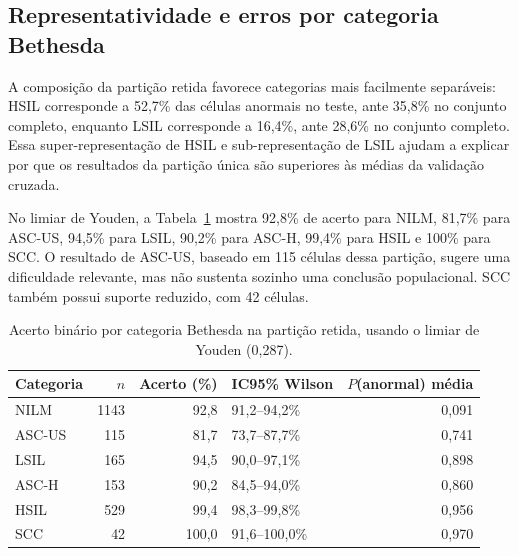 \subsection{Representatividade e erros por categoria Bethesda}

A composição da partição retida favorece categorias mais facilmente separáveis:
HSIL corresponde a 52,7\% das células anormais no teste, ante 35,8\% no
conjunto completo, enquanto LSIL corresponde a 16,4\%, ante 28,6\% no conjunto
completo. Essa super-representação de HSIL e sub-representação de LSIL ajudam a
explicar por que os resultados da partição única são superiores às médias da
validação cruzada.

No limiar de Youden, a Tabela~\ref{tab:bethesda} mostra 92,8\% de acerto para
NILM, 81,7\% para ASC-US, 94,5\% para LSIL, 90,2\% para ASC-H, 99,4\% para HSIL
e 100\% para SCC. O resultado de ASC-US, baseado em 115 células dessa partição,
sugere uma dificuldade relevante, mas não sustenta sozinho uma conclusão
populacional. SCC também possui suporte reduzido, com 42 células.

\begin{table}[ht]
\centering
\caption{Acerto binário por categoria Bethesda na partição retida, usando o
limiar de Youden (0,287).}
\label{tab:bethesda}
\small
\setlength{\tabcolsep}{5pt}
\begin{tabular}{lrrlr}
\toprule
Categoria & $n$ & Acerto (\%) & IC95\% Wilson & $P$(anormal) média \\
\midrule
NILM & 1143 & 92,8 & 91,2--94,2\% & 0,091 \\
ASC-US & 115 & 81,7 & 73,7--87,7\% & 0,741 \\
LSIL & 165 & 94,5 & 90,0--97,1\% & 0,898 \\
ASC-H & 153 & 90,2 & 84,5--94,0\% & 0,860 \\
HSIL & 529 & 99,4 & 98,3--99,8\% & 0,956 \\
SCC & 42 & 100,0 & 91,6--100,0\% & 0,970 \\
\bottomrule
\end{tabular}
\end{table}
